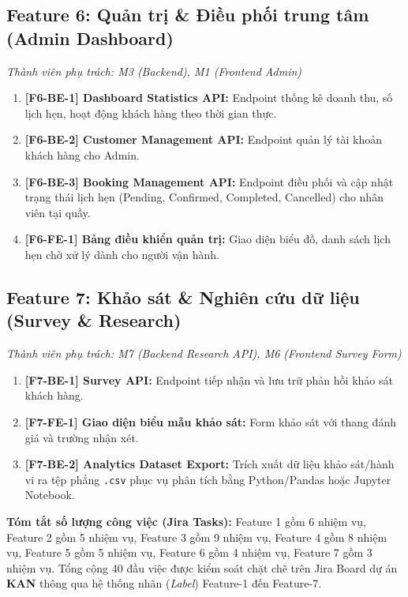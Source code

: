 \subsection{Feature 6: Quản trị \& Điều phối trung tâm (Admin Dashboard)}
\textit{Thành viên phụ trách: M3 (Backend), M1 (Frontend Admin)}

\begin{enumerate}
    \item \textbf{[F6-BE-1] Dashboard Statistics API:} Endpoint thống kê doanh thu, số lịch hẹn, hoạt động khách hàng theo thời gian thực.
    \item \textbf{[F6-BE-2] Customer Management API:} Endpoint quản lý tài khoản khách hàng cho Admin.
    \item \textbf{[F6-BE-3] Booking Management API:} Endpoint điều phối và cập nhật trạng thái lịch hẹn (Pending, Confirmed, Completed, Cancelled) cho nhân viên tại quầy.
    \item \textbf{[F6-FE-1] Bảng điều khiển quản trị:} Giao diện biểu đồ, danh sách lịch hẹn chờ xử lý dành cho người vận hành.
\end{enumerate}

\subsection{Feature 7: Khảo sát \& Nghiên cứu dữ liệu (Survey \& Research)}
\textit{Thành viên phụ trách: M7 (Backend Research API), M6 (Frontend Survey Form)}

\begin{enumerate}
    \item \textbf{[F7-BE-1] Survey API:} Endpoint tiếp nhận và lưu trữ phản hồi khảo sát khách hàng.
    \item \textbf{[F7-FE-1] Giao diện biểu mẫu khảo sát:} Form khảo sát với thang đánh giá và trường nhận xét.
    \item \textbf{[F7-BE-2] Analytics Dataset Export:} Trích xuất dữ liệu khảo sát/hành vi ra tệp phẳng \texttt{.csv} phục vụ phân tích bằng Python/Pandas hoặc Jupyter Notebook.
\end{enumerate}

\noindent \textbf{Tóm tắt số lượng công việc (Jira Tasks):} Feature 1 gồm 6 nhiệm vụ, Feature 2 gồm 5 nhiệm vụ, Feature 3 gồm 9 nhiệm vụ, Feature 4 gồm 8 nhiệm vụ, Feature 5 gồm 5 nhiệm vụ, Feature 6 gồm 4 nhiệm vụ, Feature 7 gồm 3 nhiệm vụ. Tổng cộng 40 đầu việc được kiểm soát chặt chẽ trên Jira Board dự án \textbf{KAN} thông qua hệ thống nhãn (\textit{Label}) Feature-1 đến Feature-7.

